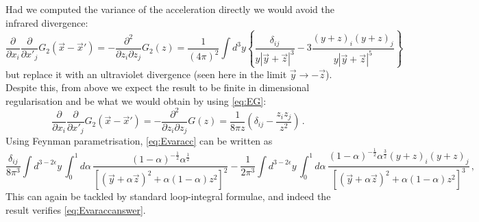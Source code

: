 \documentclass[aps,preprintnumbers,superscriptaddress,longbibliography]{revtex4-1}
\begin{document}
Had we computed the variance of the acceleration directly we would avoid the infrared divergence:
\begin{equation}
\label{eq:Evaracc}
    \frac{\partial}{\partial x_i} \frac{\partial}{\partial x'_j} G_2(\vec{x}-\vec{x}') = -\frac{\partial^2}{\partial z_i \partial z_j} G_2(z) = \frac{1}{(4\pi)^2}\int\!d^3y\left\{ \frac{\delta_{ij}}{y |\vec{y}+\vec{z}|^3}-3\frac{(y+z)_i (y+z)_j}{y|\vec{y}+\vec{z}|^5}\right\}
\end{equation}
but replace it with an ultraviolet divergence (seen here in the limit $\vec{y}\to-\vec{z}$). Despite this, from above we expect the result to be finite in dimensional regularisation and be what we would obtain by using \eqref{eq:EG}:
\begin{equation}
\label{eq:Evaraccanswer}
  \frac{\partial}{\partial x_i} \frac{\partial}{\partial x'_j} G_2(\vec{x}-\vec{x}') =  -\frac{\partial^2}{\partial z_i \partial z_j} G(z) = \frac{1}{8\pi z}\left(\delta_{ij}-\frac{z_iz_j}{z^2}\right)\,.
\end{equation}
Using Feynman parametrisation, \eqref{eq:Evaracc} can be written as
\begin{equation}
   \frac{\delta_{ij}}{8\pi^3} \int\! d^{3-2\epsilon}y\, \int_0^1\!\! d\alpha \,
   \frac{(1-\alpha)^{-\frac{1}{2}}\alpha^{\frac{1}{2}}}{\left[(\vec{y}+\alpha \vec{z})^2 + \alpha(1-\alpha)z^2\right]^2}
   -\frac{1}{2\pi^3}\int\! d^{3-2\epsilon}y\, \int_0^1\!\! d\alpha \,
   \frac{(1-\alpha)^{-\frac{1}{2}}\alpha^{\frac{3}{2}}(y+z)_i(y+z)_j}{\left[(\vec{y}+\alpha \vec{z})^2 + \alpha(1-\alpha)z^2\right]^3}\,,
\end{equation}
This can again be tackled by standard loop-integral formulae, and indeed the result verifies \eqref{eq:Evaraccanswer}.
\end{document}
